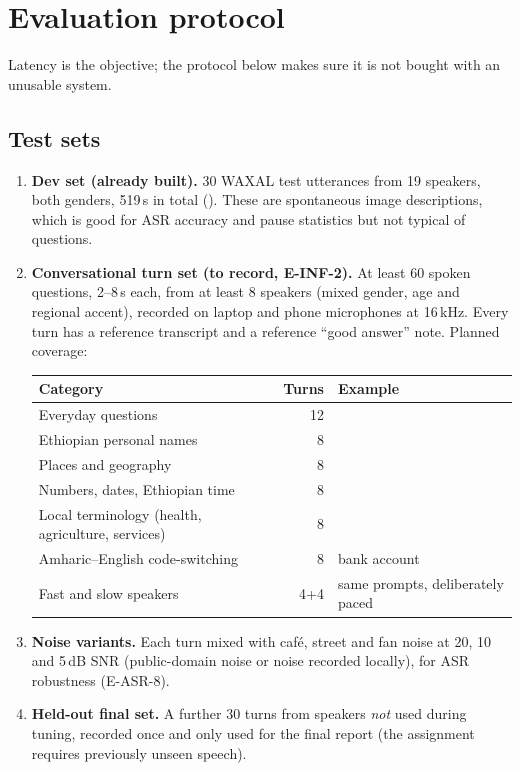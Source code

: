\section{Evaluation protocol}
\label{sec:eval}

Latency is the objective; the protocol below makes sure it is not bought with an unusable system.

\subsection{Test sets}
\begin{enumerate}
  \item \textbf{Dev set (already built).} 30 WAXAL test utterances from 19 speakers, both genders,
  519\,s in total (). These are spontaneous image descriptions,
  which is good for ASR accuracy and pause statistics but not typical of questions.
  \item \textbf{Conversational turn set (to record, E-INF-2).} At least 60 spoken questions, 2--8\,s each,
  from at least 8 speakers (mixed gender, age and regional accent), recorded on laptop and phone
  microphones at 16\,kHz. Every turn has a reference transcript and a reference ``good answer'' note.
  Planned coverage:
  \begin{center}\small
  \begin{tabularx}{0.95\linewidth}{@{}L{4.6cm}rY@{}}
  \toprule
  \textbf{Category} & \textbf{Turns} & \textbf{Example} \\
  \midrule
  Everyday questions & 12 &  \\
  Ethiopian personal names & 8 &  \\
  Places and geography & 8 &  \\
  Numbers, dates, Ethiopian time & 8 &  \\
  Local terminology (health, agriculture, services) & 8 &  \\
  Amharic--English code-switching & 8 &  bank account  \\
  Fast and slow speakers & 4+4 & same prompts, deliberately paced \\
  \bottomrule
  \end{tabularx}
  \end{center}
  \item \textbf{Noise variants.} Each turn mixed with café, street and fan noise at 20, 10 and 5\,dB SNR
  (public-domain noise or noise recorded locally), for ASR robustness (E-ASR-8).
  \item \textbf{Held-out final set.} A further 30 turns from speakers \emph{not} used during tuning, recorded
  once and only used for the final report (the assignment requires previously unseen speech).
\end{enumerate}

